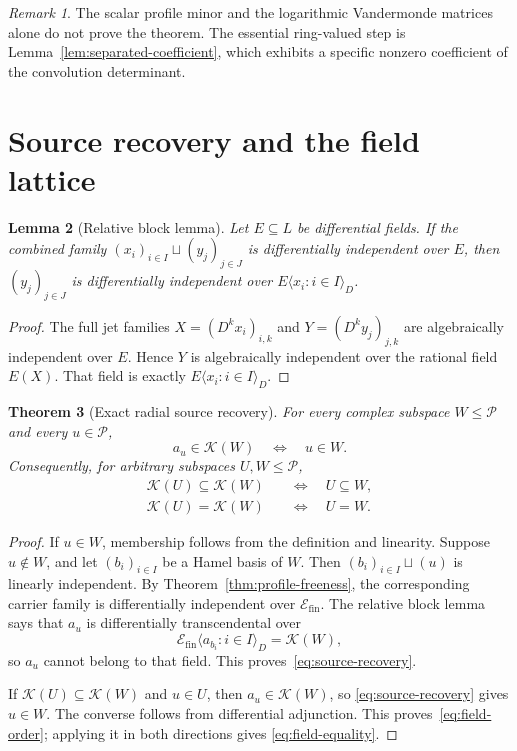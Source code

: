 \documentclass[11pt]{article}
\newtheorem{theorem}{Theorem}[section]
\newtheorem{lemma}[theorem]{Lemma}
\theoremstyle{definition}
\theoremstyle{remark}
\newtheorem{remark}[theorem]{Remark}
\newcommand{\Efin}{\mathcal E_{\mathrm{fin}}}
\newcommand{\Pcal}{\mathcal P}
\newcommand{\K}{\mathcal K}
\begin{document}
\begin{remark}
The scalar profile minor and the logarithmic Vandermonde matrices alone do not prove the theorem.
The essential ring-valued step is Lemma~\ref{lem:separated-coefficient}, which exhibits a
specific nonzero coefficient of the convolution determinant.
\end{remark}

\section{Source recovery and the field lattice}\label{sec:source-recovery}

\begin{lemma}[Relative block lemma]\label{lem:relative-block}
Let $E\subseteq L$ be differential fields.  If the combined family
$(x_i)_{i\in I}\sqcup(y_j)_{j\in J}$ is differentially independent over $E$, then
$(y_j)_{j\in J}$ is differentially independent over
$E\langle x_i:i\in I\rangle_D$.
\end{lemma}

\begin{proof}
The full jet families $X=(D^kx_i)_{i,k}$ and $Y=(D^ky_j)_{j,k}$ are algebraically independent over
$E$.  Hence $Y$ is algebraically independent over the rational field $E(X)$.  That field is
exactly $E\langle x_i:i\in I\rangle_D$.
\end{proof}

\begin{theorem}[Exact radial source recovery]\label{thm:source-recovery}
For every complex subspace $W\le\Pcal$ and every $u\in\Pcal$,
\begin{equation}\label{eq:source-recovery}
 a_u\in\K(W)\quad\Longleftrightarrow\quad u\in W.
\end{equation}
Consequently, for arbitrary subspaces $U,W\le\Pcal$,
\begin{align}
 \K(U)\subseteq\K(W)&\quad\Longleftrightarrow\quad U\subseteq W,
                                                        \label{eq:field-order}\\
 \K(U)=\K(W)&\quad\Longleftrightarrow\quad U=W.        \label{eq:field-equality}
\end{align}
\end{theorem}

\begin{proof}
If $u\in W$, membership follows from the definition and linearity.  Suppose $u\notin W$, and let
$(b_i)_{i\in I}$ be a Hamel basis of $W$.  Then $(b_i)_{i\in I}\sqcup(u)$ is linearly independent.
By Theorem~\ref{thm:profile-freeness}, the corresponding carrier family is differentially
independent over $\Efin$.  The relative block lemma says that $a_u$ is differentially
transcendental over
\[
 \Efin\langle a_{b_i}:i\in I\rangle_D=\K(W),
\]
so $a_u$ cannot belong to that field.  This proves~\eqref{eq:source-recovery}.

If $\K(U)\subseteq\K(W)$ and $u\in U$, then $a_u\in\K(W)$, so
\eqref{eq:source-recovery} gives $u\in W$.  The converse follows from differential adjunction.
This proves~\eqref{eq:field-order}; applying it in both directions gives
\eqref{eq:field-equality}.
\end{proof}
\end{document}
